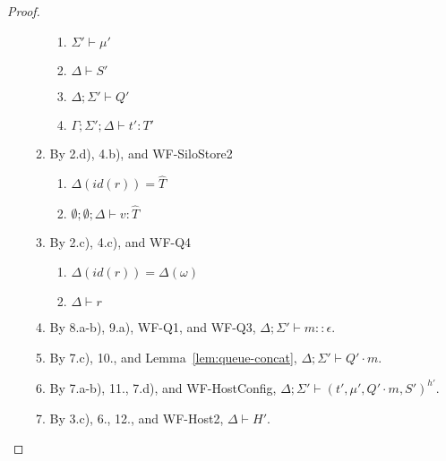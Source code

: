 \begin{proof}
\begin{itemize}
\begin{enumerate}
\begin{enumerate}[label=(\alph*)]
  \item $\Sigma' \vdash \mu'$
  \item $\Delta \vdash S'$
  \item $\Delta ; \Sigma' \vdash Q'$
  \item $\Gamma ; \Sigma' ; \Delta \vdash t' : T'$
  \end{enumerate}
\item By 2.d), 4.b), and WF-SiloStore2
  \begin{enumerate}[label=(\alph*)]
  \item $\Delta(id(r)) = \hat{T}$
  \item $\emptyset ; \emptyset ; \Delta \vdash v : \hat{T}$
  \end{enumerate}
\item By 2.c), 4.c), and WF-Q4
  \begin{enumerate}[label=(\alph*)]
  \item $\Delta(id(r)) = \Delta(\omega)$
  \item $\Delta \vdash r$
  \end{enumerate}
\item By 8.a-b), 9.a), WF-Q1, and WF-Q3, $\Delta ; \Sigma' \vdash m :: \epsilon$.
\item By 7.c), 10., and Lemma~\ref{lem:queue-concat}, $\Delta ; \Sigma' \vdash Q' \cdot m$.
\item By 7.a-b), 11., 7.d), and WF-HostConfig, $\Delta ; \Sigma' \vdash (t', \mu', Q' \cdot m, S')^{h'}$.
\item By 3.c), 6., 12., and WF-Host2, $\Delta \vdash H'$.
\end{enumerate}


\end{itemize}
\end{proof}

